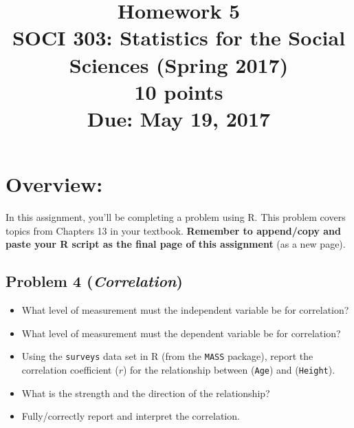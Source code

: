 \documentclass{article}
\begin{document}
\title{Homework 5\\ SOCI 303: Statistics for the Social Sciences (Spring 2017) \\ {\large{10 points}} \\ {\large{Due: May 19, 2017}}}
\author[*]{}
\date{}
\maketitle



\section*{Overview:}
In this assignment, you'll be completing a problem using R. This problem covers topics from Chapters 13 in your textbook. \textbf{Remember to append/copy and paste your R script as the final page of this assignment} (as a new page).


\subsection*{Problem 4 (\textit{Correlation})}
\begin{itemize}
\item What level of measurement must the independent variable be for correlation?
\item What level of measurement must the dependent variable be for correlation?
\item Using the \texttt{surveys} data set in R (from the \texttt{MASS} package), report the correlation coefficient ($r$) for the relationship between (\texttt{Age}) and (\texttt{Height}).
\item What is the strength and the direction of the relationship?
\item Fully/correctly report and interpret the correlation.
\end{itemize}
\end{document}
